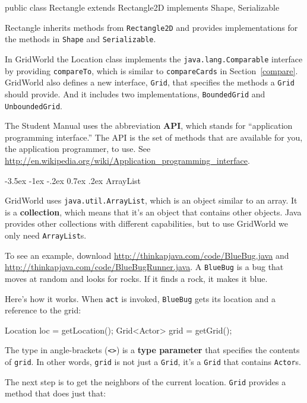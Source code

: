 \documentclass[12pt]{book}
\makeatletter
\renewcommand{\section}{\@startsection {section}{1}{\z@}%
    {-3.5ex \@plus -1ex \@minus -.2ex}%
    {0.7ex \@plus.2ex}%
    {\normalfont\Large\bfseries}}
\theoremstyle{exercise}
\newcommand{\java}[1]{\lstinline{#1}} %
\makeatother
\begin{document}
\begin{code}
public class Rectangle extends Rectangle2D implements Shape, Serializable
\end{code}

Rectangle inherits methods from \java{Rectangle2D} and provides implementations for the methods in \java{Shape} and \java{Serializable}.

In GridWorld the Location class implements the \java{java.lang.Comparable} interface by providing \java{compareTo}, which is similar to \java{compareCards} in Section~\ref{compare}.
%
GridWorld also defines a new interface, \java{Grid}, that specifies the methods a \java{Grid} should provide.
And it includes two implementations, \java{BoundedGrid} and \java{UnboundedGrid}.

The Student Manual uses the abbreviation {\bf API}, which stands for ``application programming interface.''
The API is the set of methods that are available for you, the application programmer, to use.
See \url{http://en.wikipedia.org/wiki/Application_programming_interface}.


\section{ArrayList}

GridWorld uses \java{java.util.ArrayList}, which is an object similar to an array.
It is a {\bf collection}, which means that it's an object that contains other objects.
Java provides other collections with different capabilities, but to use GridWorld we only need \java{ArrayList}s.

To see an example, download \url{http://thinkapjava.com/code/BlueBug.java} and \url{http://thinkapjava.com/code/BlueBugRunner.java}.
A \java{BlueBug} is a bug that moves at random and looks for rocks.
If it finds a rock, it makes it blue.

Here's how it works.
When \java{act} is invoked, \java{BlueBug} gets its location and a reference to the grid:

\begin{code}
    Location loc = getLocation();
    Grid<Actor> grid = getGrid();
\end{code}

The type in angle-brackets (\verb"<>") is a {\bf type parameter} that specifies the contents of \java{grid}.
In other words, \java{grid} is not just a \java{Grid}, it's a \java{Grid} that contains \java{Actor}s.

The next step is to get the neighbors of the current location.
\java{Grid} provides a method that does just that:
\end{document}
